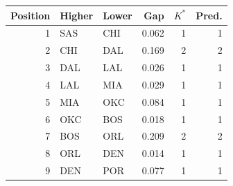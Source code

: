 \begin{tabular}{rllrrr}
\toprule
Position & Higher & Lower & Gap & $K^*$ & Pred. \\
\midrule
1 & SAS & CHI & 0.062 & 1 & 1 \\
2 & CHI & DAL & 0.169 & 2 & 2 \\
3 & DAL & LAL & 0.026 & 1 & 1 \\
4 & LAL & MIA & 0.029 & 1 & 1 \\
5 & MIA & OKC & 0.084 & 1 & 1 \\
6 & OKC & BOS & 0.018 & 1 & 1 \\
7 & BOS & ORL & 0.209 & 2 & 2 \\
8 & ORL & DEN & 0.014 & 1 & 1 \\
9 & DEN & POR & 0.077 & 1 & 1 \\
\bottomrule
\end{tabular}

